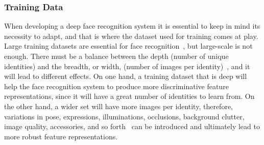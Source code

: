 \documentclass[class=report, crop=false, a4paper, 12pt]{standalone}
\begin{document}
\subsubsection{\large Training Data}
\par When developing a deep face recognition system it is essential to keep in mind its necessity to adapt, and that is where the dataset used for training comes at play. Large training datasets are essential for face recognition~\autocite{parkhiDeepFaceRecognition2015}, but large-scale is not enough. There must be a balance between the depth (number of unique identities) and the breadth, or width, (number of images per identity)~\autocite{bansalDonTsCNNbased2017, caoVGGFace2DatasetRecognising2018}, and it will lead to different effects. On one hand, a training dataset that is deep will help the face recognition system to produce more discriminative feature representations, since it will have a great number of identities to learn from. On the other hand, a wider set will have more images per identity, therefore, variations in pose, expressions, illuminations, occlusions, background clutter, image quality, accessories, and so forth~\autocite{baeDigiFace1MMillionDigital2023} can be introduced and ultimately lead to more robust feature representations.

% 
\end{document}
